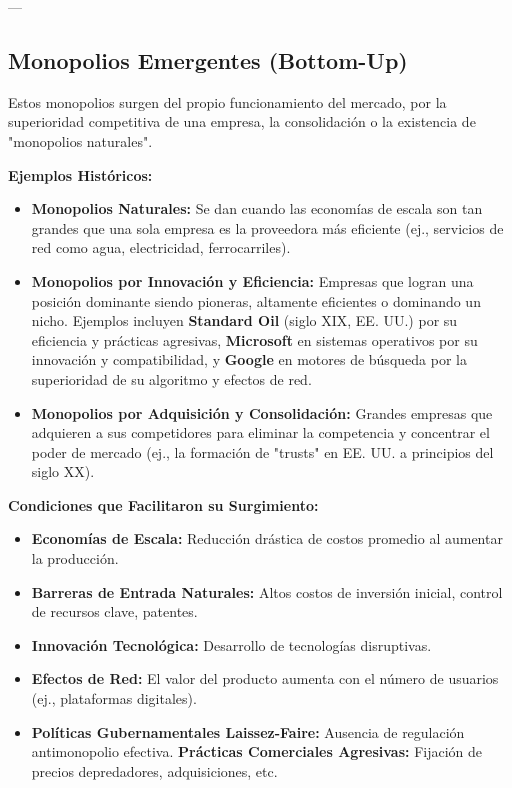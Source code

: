 \documentclass{article}
\begin{document}
---

\subsection{Monopolios Emergentes (Bottom-Up)}
Estos monopolios surgen del propio funcionamiento del mercado, por la superioridad competitiva de una empresa, la consolidación o la existencia de "monopolios naturales".

\textbf{Ejemplos Históricos:}
\begin{itemize}
    \item \textbf{Monopolios Naturales:} Se dan cuando las economías de escala son tan grandes que una sola empresa es la proveedora más eficiente (ej., servicios de red como agua, electricidad, ferrocarriles).
    \item \textbf{Monopolios por Innovación y Eficiencia:} Empresas que logran una posición dominante siendo pioneras, altamente eficientes o dominando un nicho. Ejemplos incluyen \textbf{Standard Oil} (siglo XIX, EE. UU.) por su eficiencia y prácticas agresivas, \textbf{Microsoft} en sistemas operativos por su innovación y compatibilidad, y \textbf{Google} en motores de búsqueda por la superioridad de su algoritmo y efectos de red.
    \item \textbf{Monopolios por Adquisición y Consolidación:} Grandes empresas que adquieren a sus competidores para eliminar la competencia y concentrar el poder de mercado (ej., la formación de "trusts" en EE. UU. a principios del siglo XX).
\end{itemize}

\textbf{Condiciones que Facilitaron su Surgimiento:}
\begin{itemize}
    \item \textbf{Economías de Escala:} Reducción drástica de costos promedio al aumentar la producción.
    \item \textbf{Barreras de Entrada Naturales:} Altos costos de inversión inicial, control de recursos clave, patentes.
    \item \textbf{Innovación Tecnológica:} Desarrollo de tecnologías disruptivas.
    \item \textbf{Efectos de Red:} El valor del producto aumenta con el número de usuarios (ej., plataformas digitales).
    \item \textbf{Políticas Gubernamentales Laissez-Faire:} Ausencia de regulación antimonopolio efectiva.
    \textbf{Prácticas Comerciales Agresivas:} Fijación de precios depredadores, adquisiciones, etc.
\end{itemize}
\end{document}
